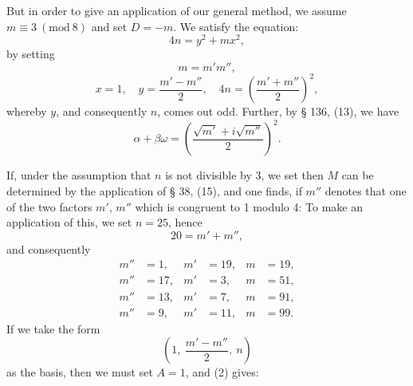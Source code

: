 
But in order to give an application of our general method, we assume $m \equiv 3\ (\mathrm{mod}\ 8)$ and set $D = -m$. We satisfy the equation:
\[4n = y^2 + mx^2,\]
by setting
\[m = m'm'',\]
\[x = 1, \quad y = \frac{m'-m''}{2}, \quad 4n = \left(\frac{m'+m''}{2}\right)^2,\]
whereby $y$, and consequently $n$, comes out odd. Further, by § 136, (13), we have
\[\alpha + \beta\omega = \left(\frac{\sqrt{m'} + i\sqrt{m''}}{2}\right)^2.\]

If, under the assumption that $n$ is not divisible by 3, we set
then $M$ can be determined by the application of § 38, (15), and one finds, if $m''$ denotes that one of the two factors $m'$, $m''$ which is congruent to 1 modulo 4:
To make an application of this, we set $n = 25$, hence
\[20 = m' + m'',\]
and consequently
\[
\begin{aligned}
m'' &= 1,  & m' &= 19, & m &= 19,\\
m'' &= 17, & m' &= 3,  & m &= 51,\\
m'' &= 13, & m' &= 7,  & m &= 91,\\
m'' &= 9,  & m' &= 11, & m &= 99.
\end{aligned}
\]
If we take the form
\[\left(1, \ \frac{m'-m''}{2}, \ n\right)\]
as the basis, then we must set $A = 1$, and (2) gives:
